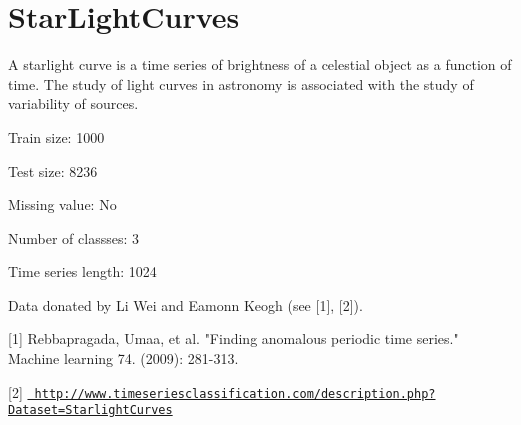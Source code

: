 \chapter{Star\+Light\+Curves}
\hypertarget{md_external_2data_2UCRArchive__2018_2StarLightCurves_2README}{}\label{md_external_2data_2UCRArchive__2018_2StarLightCurves_2README}
\label{md_external_2data_2UCRArchive__2018_2StarLightCurves_2README_autotoc_md214}%
%
 A starlight curve is a time series of brightness of a celestial object as a function of time. The study of light curves in astronomy is associated with the study of variability of sources.

Train size\+: 1000

Test size\+: 8236

Missing value\+: No

Number of classses\+: 3

Time series length\+: 1024

Data donated by Li Wei and Eamonn Keogh (see \mbox{[}1\mbox{]}, \mbox{[}2\mbox{]}).

\mbox{[}1\mbox{]} Rebbapragada, Umaa, et al. "{}\+Finding anomalous periodic time series."{} Machine learning 74. (2009)\+: 281-\/313.

\mbox{[}2\mbox{]} \href{http://www.timeseriesclassification.com/description.php?Dataset=StarlightCurves}{\texttt{ http\+://www.\+timeseriesclassification.\+com/description.\+php?\+Dataset=\+Starlight\+Curves}} 